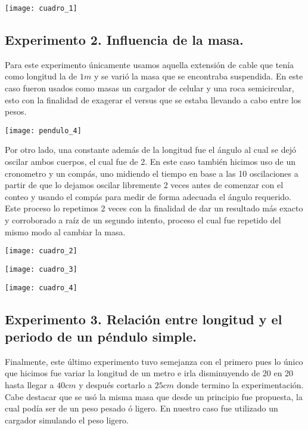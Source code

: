 \documentclass[11pt]{article}
\newenvironment{Figuras}
  {\par\medskip\noindent\minipage{\linewidth}}
  {\endminipage\par\medskip}
\begin{document}
\begin{multicols}{2}
\begin{Figuras}
	\centering
    \texttt{[image: cuadro\_1]}
	
    \label{fig:mesh55}
\end{Figuras}

	\subsection{Experimento 2. Influencia de la masa.}
	Para este experimento únicamente usamos aquella extensión de cable que tenía como longitud la de $1m$ y se varió la masa que se encontraba suspendida. En este caso fueron usados como masas un cargador de celular y una roca semicircular, esto con la finalidad de exagerar el versus que se estaba llevando a cabo entre los pesos.

\begin{Figuras}
	\centering
    \texttt{[image: pendulo\_4]}
    \label{fig:mesh4}
\end{Figuras}

Por otro lado, una constante además de la longitud fue el ángulo al cual se dejó oscilar ambos cuerpos, el cual fue de 2\degree. En este caso también hicimos uso de un cronometro y un compás, uno midiendo el tiempo en base a las 10 oscilaciones a partir de que lo dejamos oscilar libremente 2 veces antes de comenzar con el conteo y usando el compás para medir de forma adecuada el ángulo requerido. 
Este proceso lo repetimos 2 veces con la finalidad de dar un resultado más exacto y corroborado a raíz de un segundo intento, proceso el cual fue repetido del mismo modo al cambiar la masa.

\begin{Figuras}
	\centering
    \texttt{[image: cuadro\_2]}
	
    \label{fig:mesh56}
\end{Figuras}

\begin{Figuras}
	\centering
    \texttt{[image: cuadro\_3]}
	
    \label{fig:mesh57}
\end{Figuras}

\begin{Figuras}
	\centering
    \texttt{[image: cuadro\_4]}
	
    \label{fig:mesh58}
\end{Figuras}

	\subsection{Experimento 3. Relación entre longitud y el periodo de un péndulo simple.}
	Finalmente, este último experimento tuvo semejanza con el primero pues lo único que hicimos fue variar la longitud de un metro e irla disminuyendo de 20 en 20 hasta llegar a $40cm$ y después cortarlo a $25cm$ donde termino la experimentación. Cabe destacar que se usó la misma masa que desde un principio fue propuesta, la cual podía ser de un peso pesado ó ligero. En nuestro caso fue utilizado un cargador simulando el peso ligero.


\end{multicols}
\end{document}
